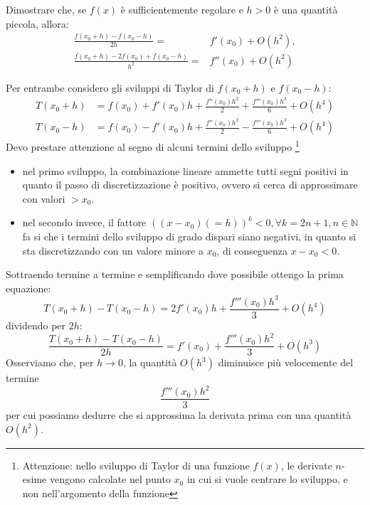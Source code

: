 \begin{exercise}[1.2]
	Dimostrare che, se $f(x)$ \`e sufficientemente regolare e $h>0$ \`e una 
	quantit\`a piccola, allora:
	\begin{equation*}
		\begin{split}
			\frac{f(x_{0}+h) - f(x_{0}-h)}{2h} =& f'(x_{0}) + O(h^{2}), \\
			\frac{f(x_{0}+h) - 2f(x_{0}) + f(x_{0}-h)}{h^{2}} =& f''(x_{0}) + O(h^{2}) 
		\end{split}
	\end{equation*}
\end{exercise}
Per entrambe considero gli sviluppi di Taylor di $f(x_{0}+h)$ e $f(x_{0}-h)$: 
\begin{equation*}
	\begin{split}
		T(x_{0} + h)& = f(x_{0}) + f'(x_{0})h + \frac{f''(x_{0})h^{2}}{2} + 
		\frac{f'''(x_{0})h^{3}}{6} + O(h^{4}) \\ 
		T(x_{0} - h)& = f(x_{0}) - f'(x_{0})h + \frac{f''(x_{0})h^{2}}{2} - 
		\frac{f'''(x_{0})h^{3}}{6} + O(h^{4})
	\end{split}
\end{equation*}
Devo prestare attenzione al segno di alcuni termini dello sviluppo
\footnote{Attenzione: nello sviluppo di Taylor di una funzione $f(x)$,  le
derivate $n$-esime vengono calcolate nel punto $x_{0}$ in cui si vuole 
centrare lo sviluppo, e non nell'argomento della funzione}
\begin{itemize}
	\item nel primo sviluppo, la combinazione lineare ammette tutti segni 
	positivi in quanto il passo di discretizzazione è positivo, ovvero si  cerca
	di approssimare con valori $ > x_{0}$.
	\item nel secondo invece, il fattore $((x - x_{0}) (=h))^{k} < 0, 
	\forall{k=2n+1, n \in \mathbb{N}}$ fa si che i termini dello sviluppo di 
	grado dispari siano negativi, in quanto si sta discretizzando con un valore 
	minore a $x_{0}$, di conseguenza $x - x_{0} < 0$.
\end{itemize}
Sottraendo termine a termine e semplificando dove possibile ottengo la prima equazione: 
\begin{equation*}
	T(x_{0}+h) - T(x_{0}-h) = 2f'(x_{0})h + \frac{f'''(x_{0})h^{3}}{3} + O(h^{4}) 
\end{equation*}
dividendo per $2h$: 
\begin{equation*}
	\frac{T(x_{0}+h) - T(x_{0}-h)}{2h} = f'(x_{0}) + \frac{f'''(x_{0})h^{2}}{3}  +
	O(h^{3})
\end{equation*}
Osserviamo che, per $h \rightarrow 0$, la quantit\`a $O(h^{3})$ diminuisce pi\`u 
velocemente del termine $$\frac{f'''(x_{0})h^{2}}{3}$$ per cui possiamo dedurre
che si approssima la derivata prima con una quantit\`a $O(h^{2})$.

